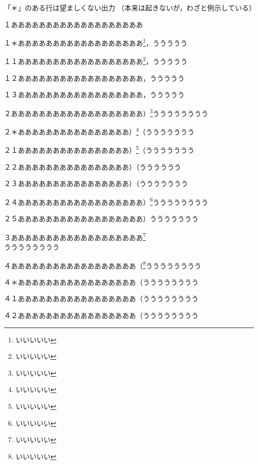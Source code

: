 \documentclass[twocolumn]{jarticle}
\begin{document}
「＊」のある行は望ましくない出力
（本来は起きないが，わざと例示している）

１あああああああああああああああああああ\par
１＊ああああああああああああああああああ\footnote[1]{いいいいい}\hskip0pt，ううううう\par
１１ああああああああああああああああああ\footnote[1]{いいいいい}，ううううう\par
１２ああああああああああああああああああ\footnotemark[1]，ううううう\par
１３ああああああああああああああああああ，ううううう\par
２あああああああああああああああああああ）\footnote[1]{いいいいい}うううううううう\par
２＊ああああああああああああああああ）\footnote[1]{いいいいい}\nobreak （ううううううう\par
２１ああああああああああああああああ）\footnote[1]{いいいいい}（ううううううう\par
２２ああああああああああああああああ）\footnotemark[1]（うううううう\par
２３ああああああああああああああああ）（ううううううう\par
２４ああああああああああああああああああ）\footnote[1]{いいいいい}うううううううう\par
２５ああああああああああああああああああ）\footnotemark[1]ううううううう\par
３あああああああああああああああああああ\footnote[1]{いいいいい}\\うううううううう\par
４ああああああああああああああああああ（\footnote[1]{いいいいい}うううううううう\par
４＊あああああああああああああああああ（\hskip0ptうううううううう\par
４１あああああああああああああああああ（うううううううう\par
４２あああああああああああああああああ（\footnotemark[1]うううううううう\par
\end{document}
